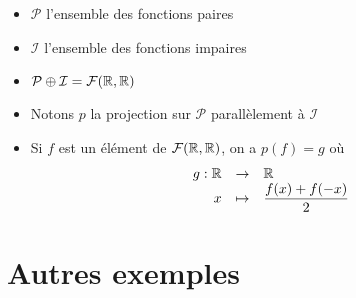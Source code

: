 \begin{frame}
\begin{exemple}
\begin{itemize}\setlength{\itemsep}{6pt}
  \item $\mathcal{P}$ l'ensemble des fonctions paires 
 
  \item $\mathcal{I}$ l'ensemble des fonctions impaires
\pause  
  \item $\mathcal{P} \oplus \mathcal{I} = \mathcal{F}(\mathbb{R} ,\mathbb{R})$
\pause  
  \item Notons $p$ la projection sur $\mathcal{P}$ parallèlement à $\mathcal{I}$
\pause  
  \item Si $f$ est un élément de 
$\mathcal{F}(\mathbb{R} ,\mathbb{R})$, on a $p(f)=g$ où 
\vspace*{-1ex}
$$\begin{array}{rcl}
g : \mathbb{R} & \to & \mathbb{R} \\
x & \mapsto & 
{\displaystyle \frac{f(x)+f(-x)}2}
\end{array}$$
  
\end{itemize}

\end{exemple}
\end{frame}



\section{Autres exemples}

